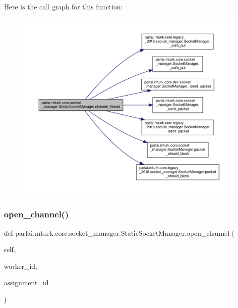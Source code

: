 Here is the call graph for this function\+:
\nopagebreak
\begin{figure}[H]
\begin{center}
\leavevmode
\includegraphics[width=350pt]{classparlai_1_1mturk_1_1core_1_1socket__manager_1_1StaticSocketManager_ac141271b1df6f50a5bfee040d7904696_cgraph}
\end{center}
\end{figure}
\mbox{\label{classparlai_1_1mturk_1_1core_1_1socket__manager_1_1StaticSocketManager_a4672bc8a07f4ae122338ceb3a59cd54a}} 
\subsubsection{\texorpdfstring{open\+\_\+channel()}{open\_channel()}}
{\footnotesize\ttfamily def parlai.\+mturk.\+core.\+socket\+\_\+manager.\+Static\+Socket\+Manager.\+open\+\_\+channel (\begin{DoxyParamCaption}\item[{}]{self,  }\item[{}]{worker\+\_\+id,  }\item[{}]{assignment\+\_\+id }\end{DoxyParamCaption})}

